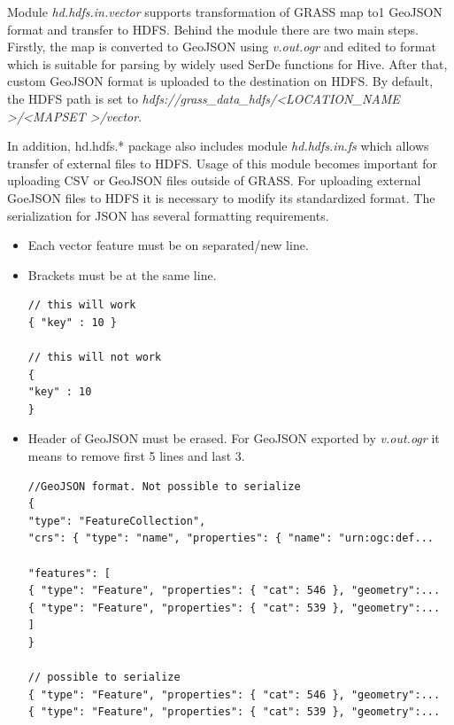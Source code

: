 \documentclass[a4paper,12pt,oneside]{report}
\begin{document}
    Module \textit{hd.hdfs.in.vector} supports transformation of GRASS map to1
    GeoJSON format and transfer to HDFS. Behind the module there are two main steps. Firstly, the map is
    converted to GeoJSON using \textit{v.out.ogr} and edited to format which is
    suitable for parsing by widely used SerDe functions for Hive. After that,
    custom GeoJSON format is uploaded to the  destination on HDFS. By default, the
    HDFS path is set to \textit{hdfs://grass\_data\_hdfs/\textless LOCATION\_NAME
    	\textgreater/\textless MAPSET \textgreater /vector}.
    
    In addition, hd.hdfs.* package also includes module \textit{hd.hdfs.in.fs} which allows
    transfer of external files to HDFS. Usage of this module becomes important for
    uploading CSV or GeoJSON files outside of GRASS. For uploading external GoeJSON files to HDFS it is
    necessary to modify its standardized format. The serialization  for
    JSON has several formatting requirements. %
	
	\begin{itemize}
		\item Each vector feature must be on separated/new line.
		\item Brackets must be at the same line.
		\begin{footnotesize}
			\begin{lstlisting}[style=python]
// this will work
{ "key" : 10 }

// this will not work
{
"key" : 10 
}
			\end{lstlisting}
		\end{footnotesize}
		
		\item Header of GeoJSON must be erased. For GeoJSON exported by
		\textit{v.out.ogr} it means to remove first 5 lines and last 3.
		\begin{footnotesize}
			\begin{lstlisting}[style=python]
//GeoJSON format. Not possible to serialize
{
"type": "FeatureCollection",
"crs": { "type": "name", "properties": { "name": "urn:ogc:def...

"features": [
{ "type": "Feature", "properties": { "cat": 546 }, "geometry":...
{ "type": "Feature", "properties": { "cat": 539 }, "geometry":...
]
}

// possible to serialize
{ "type": "Feature", "properties": { "cat": 546 }, "geometry":...
{ "type": "Feature", "properties": { "cat": 539 }, "geometry":...
			\end{lstlisting}
		\end{footnotesize}
	\end{itemize}
	
\end{document}
